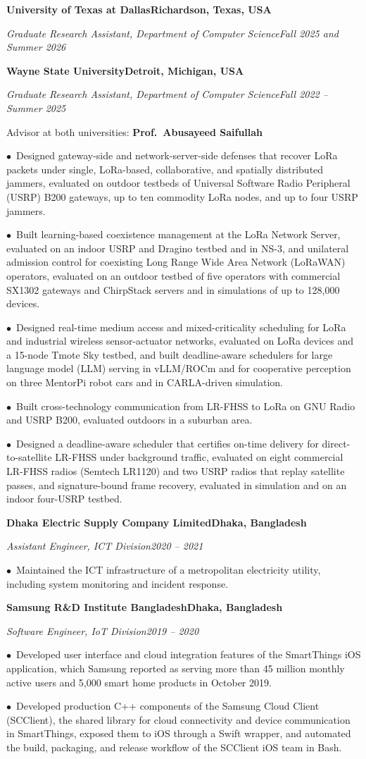 \documentclass[letterpaper,11pt]{article}
\newlength{\ind}\setlength{\ind}{16.4pt}
\newif\iffirst
\newif\ifhead %
\newcommand{\gap}{\iffirst\global\firstfalse\else\vspace{6.7pt}\fi}
\newcommand{\sect}[1]{\par\leftskip=0pt\addvspace{7.7pt}\Needspace{8\baselineskip}%
  {\normalsize\bfseries\MakeUppercase{#1}\par}\nobreak
  \vskip-\prevdepth\vskip6.2pt\hrule height 0.4pt\nobreak\prevdepth=0pt\vskip2.0pt\nobreak
  \leftskip=\ind\global\firsttrue\global\headtrue}
\newcommand{\org}[2]{\par\ifhead\global\headfalse\else\Needspace{3\baselineskip}\fi%
  {\fontsize{10.95}{12}\selectfont\bfseries #1\hfill #2\par}\nobreak}
\newcommand{\role}[2]{\par\textit{#1}\hfill\textit{#2}\par\nobreak}
\newcommand{\titem}{\par\global\firstfalse\global\headfalse$\bullet$\ }
\begin{document}
\gap\org{University of Texas at Dallas}{Richardson, Texas, USA}
\role{Graduate Research Assistant, Department of Computer Science}{Fall 2025 and Summer 2026}
\org{Wayne State University}{Detroit, Michigan, USA}
\role{Graduate Research Assistant, Department of Computer Science}{Fall 2022 -- Summer 2025}
Advisor at both universities: \textbf{Prof.\ Abusayeed Saifullah}\par\nobreak
\titem Designed gateway-side and network-server-side defenses that recover LoRa packets under single, LoRa-based, collaborative, and spatially distributed jammers, evaluated on outdoor testbeds of Universal Software Radio Peripheral (USRP) B200 gateways, up to ten commodity LoRa nodes, and up to four USRP jammers.
\titem Built learning-based coexistence management at the LoRa Network Server, evaluated on an indoor USRP and Dragino testbed and in NS-3, and unilateral admission control for coexisting Long Range Wide Area Network (LoRaWAN) operators, evaluated on an outdoor testbed of five operators with commercial SX1302 gateways and ChirpStack servers and in simulations of up to 128,000 devices.
\titem Designed real-time medium access and mixed-criticality scheduling for LoRa and industrial wireless sensor-actuator networks, evaluated on LoRa devices and a 15-node Tmote Sky testbed, and built deadline-aware schedulers for large language model (LLM) serving in vLLM/ROCm and for cooperative perception on three MentorPi robot cars and in CARLA-driven simulation.
\titem Built cross-technology communication from LR-FHSS to LoRa on GNU Radio and USRP B200, evaluated outdoors in a suburban area.
\titem Designed a deadline-aware scheduler that certifies on-time delivery for direct-to-satellite LR-FHSS under background traffic, evaluated on eight commercial LR-FHSS radios (Semtech LR1120) and two USRP radios that replay satellite passes, and signature-bound frame recovery, evaluated in simulation and on an indoor four-USRP testbed.

\gap\org{Dhaka Electric Supply Company Limited}{Dhaka, Bangladesh}
\role{Assistant Engineer, ICT Division}{2020 -- 2021}
\titem Maintained the ICT infrastructure of a metropolitan electricity utility, including system monitoring and incident response.

\gap\org{Samsung R\&D Institute Bangladesh}{Dhaka, Bangladesh}
\role{Software Engineer, IoT Division}{2019 -- 2020}
\titem Developed user interface and cloud integration features of the SmartThings iOS application, which Samsung reported as serving more than 45 million monthly active users and 5,000 smart home products in October 2019.
\titem Developed production C++ components of the Samsung Cloud Client (SCClient), the shared library for cloud connectivity and device communication in SmartThings, exposed them to iOS through a Swift wrapper, and automated the build, packaging, and release workflow of the SCClient iOS team in Bash.
\end{document}
